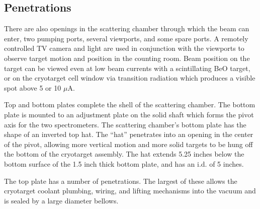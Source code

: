 {\subsection{Penetrations}

There are also openings in the scattering chamber through which the
beam can enter, two pumping ports, several viewports, and some spare
ports. A remotely controlled TV camera and light are used in
conjunction with the viewports to observe target motion and position
in the counting room. Beam position on the target can be viewed even
at low beam currents with a scintillating BeO target, or on the
cryotarget cell window via transition radiation which produces a
visible spot above 5 or 10 $\mu$A.

Top and bottom plates complete the shell of the scattering chamber.
The bottom plate is mounted to an adjustment plate on the solid shaft
which forms the pivot axis for the two spectrometers. The scattering
chamber's bottom plate has the shape of an inverted top hat. The
``hat'' penetrates into an opening in the center of the pivot,
allowing more vertical motion and more solid targets to be hung off
the bottom of the cryotarget assembly. The hat extends 5.25 inches
below the bottom surface of the 1.5 inch thick bottom plate, and has
an i.d. of 5 inches.

The top plate has a number of penetrations. The largest of these
allows the cryotarget coolant plumbing, wiring, and lifting mechanisms
into the vacuum and is sealed by a large diameter bellows.




}
